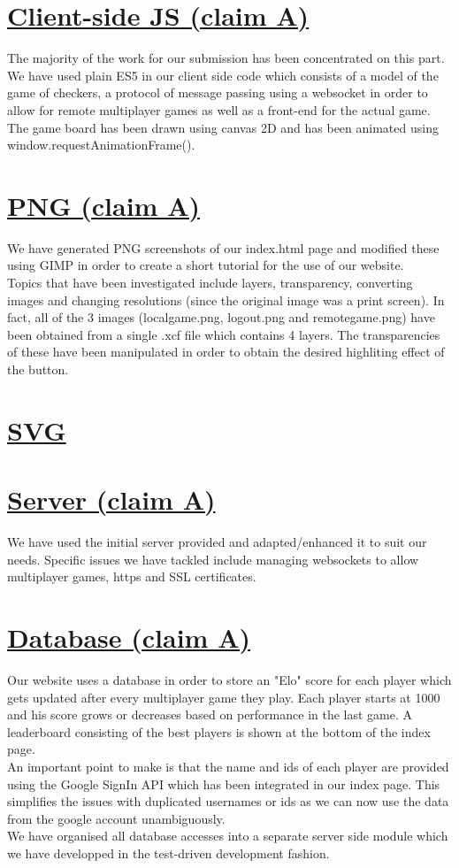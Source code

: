 \documentclass{article}
\begin{document}
\section{\underline{Client-side JS (claim A)}}\label{sec:clientJS}
    The majority of the work for our submission has been concentrated on this part. We have used plain ES5 in our client side code which consists of a model of the game of checkers,
    a protocol of message passing using a websocket in order to allow for remote multiplayer games as well as a front-end for the actual game.\\
    \indent The game board has been drawn using canvas 2D and has been animated using window.requestAnimationFrame().
\section{\underline{PNG (claim A)}}\label{sec:PNG}
    We have generated PNG screenshots of our index.html page and modified these using GIMP in order to create a short tutorial for the use of our website.\\
    \indent Topics that have been investigated include layers, transparency, converting images and changing resolutions (since the original image was a print screen).
    In fact, all of the 3 images (localgame.png, logout.png and remotegame.png) have been obtained from a single .xcf file which contains 4 layers. The transparencies of these
    have been manipulated in order to obtain the desired highliting effect of the button.
\section{\underline{SVG}}\label{sec:SVG}
\section{\underline{Server (claim A)}}\label{sec:Server}
    We have used the initial server provided and adapted/enhanced it to suit our needs. 
    Specific issues we have tackled include managing websockets to allow multiplayer games, https and SSL certificates.
\section{\underline{Database (claim A)}}\label{sec:Database}
    Our website uses a database in order to store an "Elo" score for each player which gets updated after every multiplayer
    game they play. Each player starts at 1000 and his score grows or decreases based on performance in the last game. A leaderboard
    consisting of the best players is shown at the bottom of the index page.\\
    \indent An important point to make is that the name and ids of each player are provided using the Google SignIn API which has been integrated in our 
    index page. This simplifies the issues with duplicated usernames or ids as we can now use the data from the google account unambiguously. \\
    \indent We have organised all database accesses into a separate server side module which we have developped in the test-driven
    development fashion.\\
\end{document}
